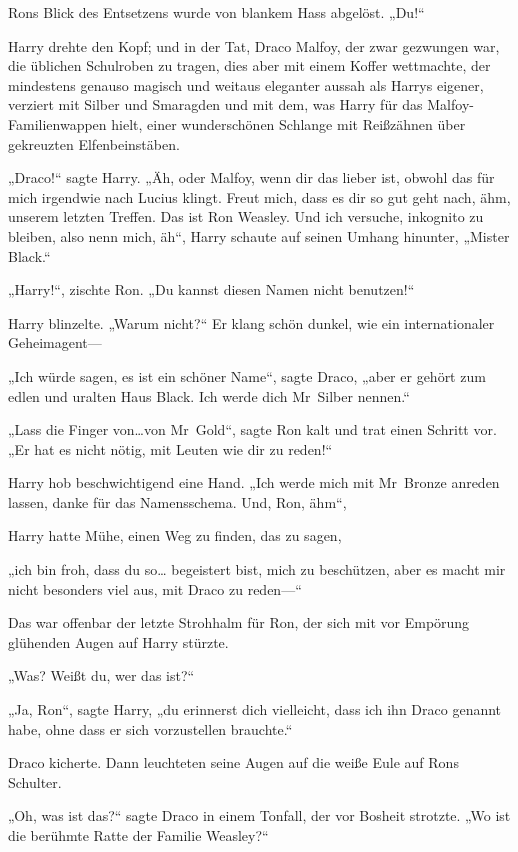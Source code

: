 {Rons Blick des Entsetzens wurde von blankem Hass abgelöst. „Du!“

Harry drehte den Kopf; und in der Tat, Draco Malfoy, der zwar gezwungen war, die üblichen Schulroben zu tragen, dies aber mit einem Koffer wettmachte, der mindestens genauso magisch und weitaus eleganter aussah als Harrys eigener, verziert mit Silber und Smaragden und mit dem, was Harry für das Malfoy-Familienwappen hielt, einer wunderschönen Schlange mit Reißzähnen über gekreuzten Elfenbeinstäben.

„Draco!“ sagte Harry. „Äh, oder Malfoy, wenn dir das lieber ist, obwohl das für mich irgendwie nach Lucius klingt. Freut mich, dass es dir so gut geht nach, ähm, unserem letzten Treffen. Das ist Ron Weasley. Und ich versuche, inkognito zu bleiben, also nenn mich, äh“, Harry schaute auf seinen Umhang hinunter, „Mister Black.“

„Harry!“, zischte Ron. „Du kannst diesen Namen nicht benutzen!“

Harry blinzelte. „Warum nicht?“ Er klang schön dunkel, wie ein internationaler Geheimagent—

„Ich würde sagen, es ist ein schöner Name“, sagte Draco, „aber er gehört zum edlen und uralten Haus Black. Ich werde dich Mr~Silber nennen.“

„Lass die Finger von…von Mr~Gold“, sagte Ron kalt und trat einen Schritt vor. „Er hat es nicht nötig, mit Leuten wie dir zu reden!“

Harry hob beschwichtigend eine Hand. „Ich werde mich mit Mr~Bronze anreden lassen, danke für das Namensschema. Und, Ron, ähm“,

Harry hatte Mühe, einen Weg zu finden, das zu sagen,

„ich bin froh, dass du so… begeistert bist, mich zu beschützen, aber es macht mir nicht besonders viel aus, mit Draco zu reden—“

Das war offenbar der letzte Strohhalm für Ron, der sich mit vor Empörung glühenden Augen auf Harry stürzte.

„Was? Weißt du, wer das ist?“

„Ja, Ron“, sagte Harry, „du erinnerst dich vielleicht, dass ich ihn Draco genannt habe, ohne dass er sich vorzustellen brauchte.“

Draco kicherte. Dann leuchteten seine Augen auf die weiße Eule auf Rons Schulter.

„Oh, was ist das?“ sagte Draco in einem Tonfall, der vor Bosheit strotzte. „Wo ist die berühmte Ratte der Familie Weasley?“

}
